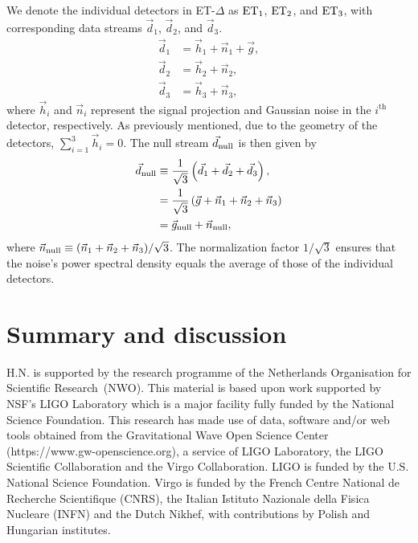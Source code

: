 \documentclass[10pt,
amsmath,
amssymb,
aps,
prd,
nofootinbib,
noeprint,
preprintnumbers,
superscriptaddress,
twocolumn]{revtex4-1}
\begin{document}
We denote the individual detectors in ET-$\Delta$ as ${\rm ET}_1$, ${\rm ET}_2$, and ${\rm ET}_3$, with 
corresponding data streams $\vec{d}_1$, $\vec{d}_2$, and $\vec{d}_3$. 
\begin{equation}
\begin{aligned}
  \vec{d}_1 &= \vec{h}_1 + \vec{n}_1 + \vec{g},\\
  \vec{d}_2 &= \vec{h}_2 + \vec{n}_2,\\
  \vec{d}_3 &= \vec{h}_3 + \vec{n}_3,
\end{aligned}
\end{equation}
where $\vec{h}_i$ and $\vec{n}_i$ represent the signal projection and Gaussian noise in the 
$i^\mathrm{th}$ detector, respectively. As previously mentioned, due to the geometry of the detectors, 
$\sum_{i=1}^3 \vec{h}_i = 0$. The null stream $\vec{d}_{\rm null}$ is then given by 
\begin{align}
\label{eq:sum_data}
  \vec{d}_{\mathrm{null}} &\equiv \frac{1}{\sqrt{3}}\left(\vec{d}_1 + \vec{d}_2 + \vec{d}_3\right),\\
  \label{eq:no_signal_eq}
  &= \frac{1}{\sqrt{3}}\left(\vec{g} + \vec{n}_1 + \vec{n}_2 + \vec{n}_3\right) \nonumber \\
  &= \vec{g}_{\rm null} + \vec{n}_{\rm null},
\end{align}
where $\vec{n}_{\rm null} \equiv (\vec{n}_1 + \vec{n}_2 + \vec{n}_3)/\sqrt{3}$. The normalization factor $1/\sqrt{3}$ ensures that the noise's power spectral density equals the average of those of the individual detectors. 

\section{Summary and discussion} 
\begin{acknowledgments}
 H.N. is supported by the research programme of the Netherlands Organisation for Scientific Research~(NWO). This material is based upon work supported by NSF's LIGO Laboratory which is a major facility fully funded by the National Science Foundation. This research has made use of data, software and/or web tools obtained from the Gravitational Wave Open Science Center (https://www.gw-openscience.org), a service of LIGO Laboratory, the LIGO Scientific Collaboration and the Virgo Collaboration. LIGO is funded by the U.S. National Science Foundation. Virgo is funded by the French Centre National de Recherche Scientifique (CNRS), the Italian Istituto Nazionale della Fisica Nucleare (INFN) and the Dutch Nikhef, with contributions by Polish and Hungarian institutes.
\end{acknowledgments}



\end{document}

